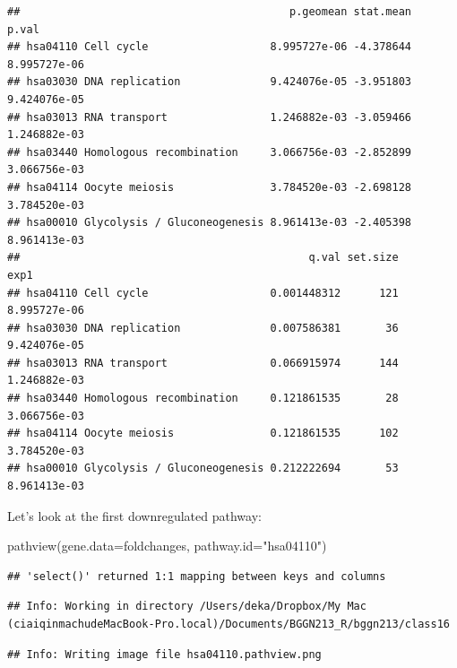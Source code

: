\documentclass[
]{article}
\newenvironment{Shaded}{\begin{snugshade}}{\end{snugshade}}
\newcommand{\AttributeTok}[1]{\textcolor[rgb]{0.77,0.63,0.00}{#1}}
\newcommand{\FunctionTok}[1]{\textcolor[rgb]{0.00,0.00,0.00}{#1}}
\newcommand{\NormalTok}[1]{#1}
\newcommand{\StringTok}[1]{\textcolor[rgb]{0.31,0.60,0.02}{#1}}
\begin{document}
\begin{verbatim}
##                                          p.geomean stat.mean        p.val
## hsa04110 Cell cycle                   8.995727e-06 -4.378644 8.995727e-06
## hsa03030 DNA replication              9.424076e-05 -3.951803 9.424076e-05
## hsa03013 RNA transport                1.246882e-03 -3.059466 1.246882e-03
## hsa03440 Homologous recombination     3.066756e-03 -2.852899 3.066756e-03
## hsa04114 Oocyte meiosis               3.784520e-03 -2.698128 3.784520e-03
## hsa00010 Glycolysis / Gluconeogenesis 8.961413e-03 -2.405398 8.961413e-03
##                                             q.val set.size         exp1
## hsa04110 Cell cycle                   0.001448312      121 8.995727e-06
## hsa03030 DNA replication              0.007586381       36 9.424076e-05
## hsa03013 RNA transport                0.066915974      144 1.246882e-03
## hsa03440 Homologous recombination     0.121861535       28 3.066756e-03
## hsa04114 Oocyte meiosis               0.121861535      102 3.784520e-03
## hsa00010 Glycolysis / Gluconeogenesis 0.212222694       53 8.961413e-03
\end{verbatim}

Let's look at the first downregulated pathway:

\begin{Shaded}
\begin{Highlighting}[]
\FunctionTok{pathview}\NormalTok{(}\AttributeTok{gene.data=}\NormalTok{foldchanges, }\AttributeTok{pathway.id=}\StringTok{"hsa04110"}\NormalTok{)}
\end{Highlighting}
\end{Shaded}

\begin{verbatim}
## 'select()' returned 1:1 mapping between keys and columns
\end{verbatim}

\begin{verbatim}
## Info: Working in directory /Users/deka/Dropbox/My Mac (ciaiqinmachudeMacBook-Pro.local)/Documents/BGGN213_R/bggn213/class16
\end{verbatim}

\begin{verbatim}
## Info: Writing image file hsa04110.pathview.png
\end{verbatim}
\end{document}
